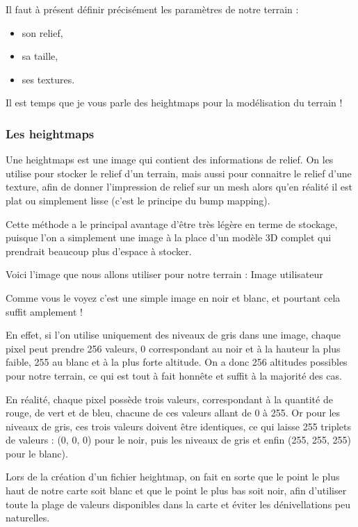 Il faut \`a pr\'esent d\'efinir pr\'ecis\'ement les param\`etres de notre terrain :

\begin{itemize}
\item son relief, 
\item sa taille,
\item ses textures.
\end{itemize}

Il est temps que je vous parle des heightmaps pour la mod\'elisation du terrain !


\subsubsection{Les heightmaps}

Une heightmaps est une image qui contient des informations de relief. On les utilise pour stocker le relief d'un terrain, mais aussi pour connaitre le relief d'une texture, afin de donner l'impression de relief sur un mesh alors qu'en r\'ealit\'e il est plat ou simplement lisse (c'est le principe du bump mapping).

Cette m\'ethode a le principal avantage d'\^etre tr\`es l\'eg\`ere en terme de stockage, puisque l'on a simplement une image \`a la place d'un mod\`ele 3D complet qui prendrait beaucoup plus d'espace \`a stocker.

Voici l'image que nous allons utiliser pour notre terrain :
Image utilisateur

Comme vous le voyez c'est une simple image en noir et blanc, et pourtant cela suffit amplement !

En effet, si l'on utilise uniquement des niveaux de gris dans une image, chaque pixel peut prendre 256 valeurs, 0 correspondant au noir et \`a la hauteur la plus faible, 255 au blanc et \`a la plus forte altitude. On a donc 256 altitudes possibles pour notre terrain, ce qui est tout \`a fait honn\^ete et suffit \`a la majorit\'e des cas.

En r\'ealit\'e, chaque pixel poss\`ede trois valeurs, correspondant \`a la quantit\'e de rouge, de vert et de bleu, chacune de ces valeurs allant de 0 \`a 255. Or pour les niveaux de gris, ces trois valeurs doivent \^etre identiques, ce qui laisse 255 triplets de valeurs : (0, 0, 0) pour le noir, puis les niveaux de gris et enfin (255, 255, 255) pour le blanc).

Lors de la cr\'eation d'un fichier heightmap, on fait en sorte que le point le plus haut de notre carte soit blanc et que le point le plus bas soit noir, afin d'utiliser toute la plage de valeurs disponibles dans la carte et \'eviter les d\'enivellations peu naturelles.

